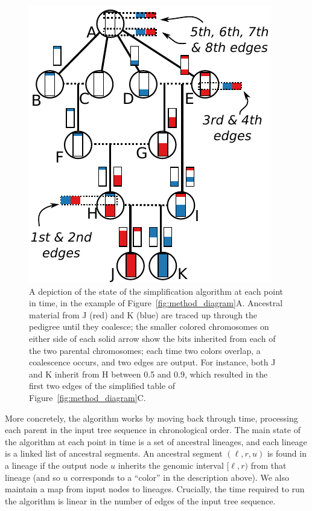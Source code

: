 \documentclass{article}
\begin{document}
\begin{figure}
    \begin{center}
        \includegraphics{simplify-state-diagram}
    \end{center}
    \caption{
        A depiction of the state of the simplification algorithm
        at each point in time,
        in the example of Figure~\ref{fig:method_diagram}A.
        Ancestral material from J (red) and K (blue) are traced up through the pedigree
        until they coalesce;
        the smaller colored chromosomes on either side of each solid arrow show the bits inherited from each of the two parental chromosomes;
        each time two colors overlap, a coalescence occurs, and two edges are output.
        For instance, both J and K inherit from H between 0.5 and 0.9,
        which resulted in the first two edges of the simplified table of Figure~\ref{fig:method_diagram}C.
        \label{fig:simplify_state}
    }
\end{figure}

More concretely,
the algorithm works by moving back through time,
processing each parent in the input tree sequence in chronological order.
The main state of the algorithm at each point in time is a set of ancestral lineages,
and each lineage is a linked list of ancestral segments.
An ancestral segment $(\ell, r, u)$ is found in a lineage
if the output node $u$ inherits the genomic interval $[\ell, r)$ from that lineage
(and so $u$ corresponds to a ``color'' in the description above).
We also maintain a map from input nodes to lineages. %
Crucially, the time required to run the algorithm is
linear in the number of edges of the input tree sequence.
\end{document}
